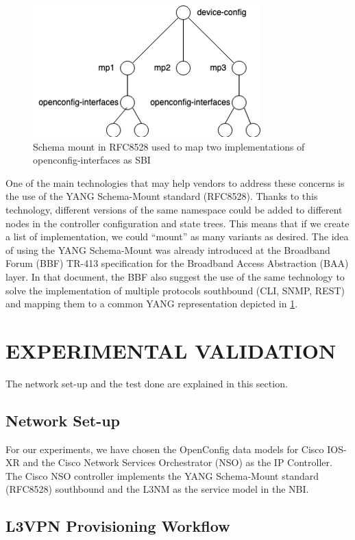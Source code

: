 \documentclass[conference]{IEEEtran}
\begin{document}
\begin{figure}
	\centering
		\includegraphics[scale=0.9]{figure3.png}
	\caption{Schema mount in RFC8528 used to map two implementations of openconfig-interfaces as SBI}
	\label{FIG:3}
\end{figure}

One of the main technologies that may help vendors to address these concerns is the use of the YANG Schema-Mount standard (RFC8528). Thanks to this technology, different versions of the same namespace could be added to different nodes in the controller configuration and state trees. This means that if we create a list of implementation, we could “mount” as many variants as desired. The idea of using the YANG Schema-Mount was already introduced at the Broadband Forum (BBF) TR-413 specification for the Broadband Access Abstraction (BAA) layer. In that document, the BBF also suggest the use of the same technology to solve the implementation of multiple protocols southbound (CLI, SNMP, REST) and mapping them to a common YANG representation depicted in \cref{FIG:3}.

\section{EXPERIMENTAL VALIDATION}
\label{sect:exp}
The network set-up and the test done are explained in this section.

\subsection{Network Set-up}
For our experiments, we have chosen the OpenConfig data models for Cisco IOS-XR and the Cisco Network Services Orchestrator (NSO) as the IP Controller. The Cisco NSO controller implements the YANG Schema-Mount standard (RFC8528) southbound and the L3NM as the service model in the NBI.

\subsection{L3VPN Provisioning Workflow}
\end{document}
